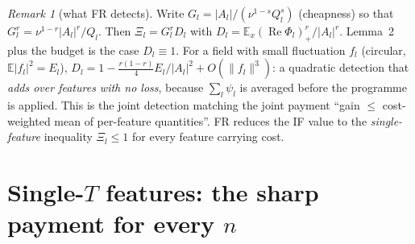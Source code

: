 \documentclass[11pt]{article}
\theoremstyle{remark}
\newtheorem{remark}[theorem]{Remark}
\renewcommand{\Re}{\operatorname{Re}}
\begin{document}
\begin{remark}[what FR detects]
Write $G_l=|A_l|/(\nu^{1-s}Q_l^s)$ (cheapness) so that $G_l^r=\nu^{1-r}|A_l|^r/Q_l$. Then $\Xi_l=G_l^r D_l$ with
$D_l=\mathbb E_x(\Re\Phi_l)_+^r/|A_l|^r$. Lemma~2 plus the budget is the case $D_l\equiv1$. For a field with small
fluctuation $f_l$ (circular, $\mathbb E|f_l|^2=E_l$), $D_l=1-\frac{r(1-r)}{4}E_l/|A_l|^2+O(\|f_l\|^3)$: a quadratic detection that
\emph{adds over features with no loss}, because $\sum_l\psi_l$ is averaged before the programme is applied. This is the joint
detection matching the joint payment ``gain $\le$ cost-weighted mean of per-feature quantities''. FR reduces the IF value to the
\emph{single-feature} inequality $\Xi_l\le1$ for every feature carrying cost.
\end{remark}

\section{Single-$T$ features: the sharp payment for every $n$}
\end{document}
